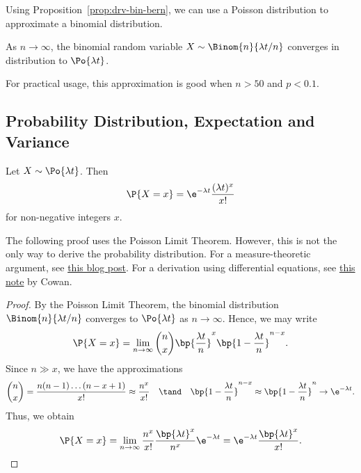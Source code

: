 Using Proposition~\ref{prop:drv-bin-bern}, we can use a Poisson distribution to approximate a binomial distribution.

\begin{corollary}
    As $n \to \infty$, the binomial random variable $X \sim \Binom{n}{\l t/n}$ converges in distribution to $\Po{\l t}$.
\end{corollary}

For practical usage, this approximation is good when $n > 50$ and $p < 0.1$.

\subsection{Probability Distribution, Expectation and Variance}

\begin{proposition}
    Let $X \sim \Po{\l t}$. Then \[\P{X = x} = \e^{-\l t} \frac{(\l t)^x}{x!}\] for non-negative integers $x$.
\end{proposition}
The following proof uses the Poisson Limit Theorem. However, this is not the only way to derive the probability distribution. For a measure-theoretic argument, see \href{https://blog.kalculate.ai/2024/03/27/poisson-distribution/}{this blog post}. For a derivation using differential equations, see \href{https://www.pp.rhul.ac.uk/~cowan/stat/notes/PoissonNote.pdf}{this note} by Cowan.
\begin{proof}
    By the Poisson Limit Theorem, the binomial distribution $\Binom{n}{\l t / n}$ converges to $\Po{\l t}$ as $n \to \infty$. Hence, we may write \[\P{X = x} = \lim_{n \to \infty} \binom{n}{x} \bp{\frac{\l t}{n}}^x \bp{1 - \frac{\l t}{n}}^{n-x}.\] Since $n \gg x$, we have the approximations \[\binom{n}{x} = \frac{n(n-1)\dots(n-x+1)}{x!} \approx \frac{n^x}{x!} \quad \tand \quad \bp{1 - \frac{\l t}{n}}^{n-x} \approx \bp{1 - \frac{\l t}{n}}^{n} \to \e^{-\l t}.\] Thus, we obtain \[\P{X = x} = \lim_{n \to \infty} \frac{n^x}{x!} \frac{\bp{\l t}^x}{n^x} \e^{-\l t} = \e^{-\l t} \frac{\bp{\l t}^x}{x!}.\]
\end{proof}
%
